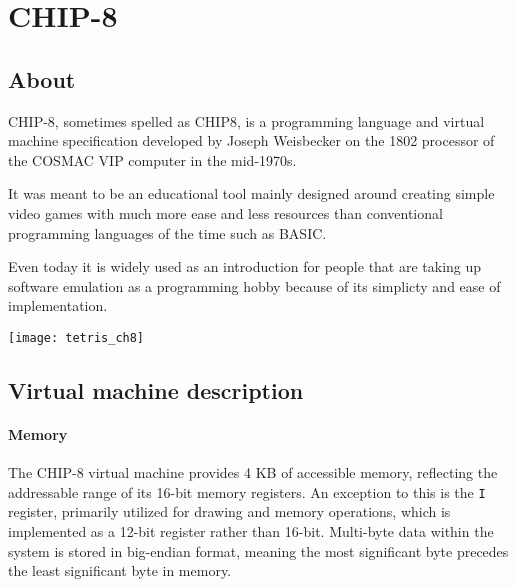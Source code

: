 \chapter{CHIP-8}
\label{chap:ch3}

\section{About}
\label{sec:ch3sec1}

\par CHIP-8, sometimes spelled as CHIP8, is a programming language and virtual machine specification developed by Joseph Weisbecker on the 1802 processor of the COSMAC VIP computer in the mid-1970s.

\par It was meant to be an educational tool mainly designed around creating simple video games with much more ease and less resources than conventional programming languages of the time such as BASIC.

\par Even today it is widely used as an introduction for people that are taking up software emulation as a programming hobby because of its simplicty and ease of implementation.

\vspace{1cm}

\begin{minipage}{\linewidth}
\texttt{[image: tetris\_ch8]}
\end{minipage}

\clearpage

\section{Virtual machine description}
\label{sec:ch3sec2}

\subsubsection{Memory}

\par The CHIP-8 virtual machine provides 4 KB of accessible memory, reflecting the addressable range of its 16-bit memory registers. An exception to this is the \texttt{I} register, primarily utilized for drawing and memory operations, which is implemented as a 12-bit register rather than 16-bit. Multi-byte data within the system is stored in big-endian format, meaning the most significant byte precedes the least significant byte in memory.


